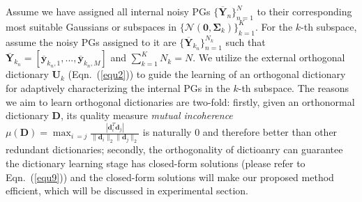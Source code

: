 \documentclass[10pt,twocolumn,letterpaper]{article}
\begin{document}
Assume we have assigned all internal noisy PGs $\{\mathbf{\overline{Y}}_{n}\}_{n=1}^{N}$ to their corresponding most suitable Gaussians or subspaces in $\{\mathcal{N}(\mathbf{0},\mathbf{\Sigma}_{k})\}_{k=1}^{K}$. For the $k$-th subspace, assume the noisy PGs assigned to it are $\{\mathbf{\overline{Y}}_{k_{n}}\}_{n=1}^{N_{k}}$ such that $\mathbf{\overline{Y}}_{k_{n}}=[\mathbf{\overline{y}}_{k_{n},1},...,\mathbf{\overline{y}}_{k_{n},M}]$ and $\sum_{k=1}^{K}N_{k}=N$. We utilize the external orthogonal dictionary $\mathbf{U}_{k}$ (Eqn.\ (\ref{equ2})) to guide the learning of an orthogonal dictionary for adaptively characterizing the internal PGs in the $k$-th subspace. The reasons we aim to learn orthogonal dictionaries are two-fold: firstly, given an orthonormal dictionary  $\mathbf{D}$, its quality measure \emph{mutual incoherence} $\mu(\mathbf{D})=\max_{i~=j}\frac{|\mathbf{d}_{i}^{T}\mathbf{d}_{j}|}{\|\mathbf{d}_{i}\|_{2}\|\mathbf{d}_{j}\|_{2}}$
is naturally $0$ and therefore better than other redundant dictionaries; secondly, the orthogonality of dictioanry can guarantee the dictionary learning stage has closed-form solutions (please refer to Eqn.\ (\ref{equ9})) and the closed-form solutions will make our proposed method efficient, which will be discussed in experimental section.
\end{document}
